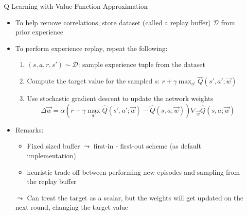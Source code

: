 \begin{frame}[c]{Q-Learning with Value Function Approximation}
	
	\begin{itemize}
		\item To help remove correlations, store dataset (called a \alert{replay buffer}) $\mathcal{D}$ from prior experience
		\item To perform experience replay, repeat the following:
		\begin{enumerate}
			\item $(s,a,r,s')\sim \mathcal{D}$: sample experience tuple from the dataset
			\item Compute the target value for the sampled $s$: $r+\gamma \max_{a'} \hat{Q}(s',a';\vec{w})$
			\item Use stochastic gradient descent to update the network weights
			$$\Delta \vec{w} = \alpha (r + \gamma \max_{a'} \hat{Q}(s',a';\vec{w}) - \hat{Q}(s,a;\vec{w})) \nabla_{\vec{w}}\hat{Q}(s,a;\vec{w})$$
		\end{enumerate}
		\pause
		\item Remarks:
		\begin{itemize}
			\item Fixed sized buffer $\leadsto$ first-in - first-out scheme (as default implementation)
			\item heuristic trade-off between performing new episodes and sampling from the replay buffer
		\end{itemize}
			
		\medskip
		\pause
		\item[$\leadsto$] Can treat the target as a scalar, but the weights will get
		updated on the next round, changing the target value
	\end{itemize}
	
\end{frame}
